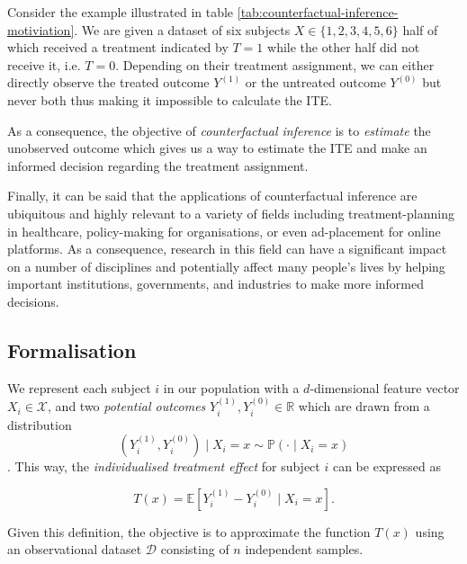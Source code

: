 Consider the example illustrated in table \ref{tab:counterfactual-inference-motiviation}. We are given a dataset of six subjects $X \in \{1, 2, 3, 4, 5, 6\}$ half of which received a treatment indicated by $T=1$ while the other half did not receive it, i.e. $T=0$. Depending on their treatment assignment, we can either directly observe the treated outcome $Y^{(1)}$ or the untreated outcome $Y^{(0)}$ but never both thus making it impossible to calculate the ITE. 


As a consequence, the objective of \emph{counterfactual inference} is to \emph{estimate} the unobserved outcome which gives us a way to estimate the ITE and make an informed decision regarding the treatment assignment. 

Finally, it can be said that the applications of counterfactual inference are ubiquitous and highly relevant to a variety of fields including treatment-planning in healthcare, policy-making for organisations, or even ad-placement for online platforms. As a consequence, research in this field can have a significant impact on a number of disciplines and potentially affect many people’s lives by helping important institutions, governments, and industries to make more informed decisions.


\subsection{Formalisation}
We represent each subject $i$ in our population  with a $d$-dimensional feature vector $X_i \in \mathcal{X}$, and two \emph{potential outcomes} $Y_{i}^{(1)}, Y_{i}^{(0)} \in \mathbb{R}$ which are drawn from a distribution
\begin{equation}
 (Y_{i}^{(1)}, Y_{i}^{(0)}) \mid X_i = x \sim \mathbb{P}(\cdot \mid X_i = x)
 \end{equation}.
  This way, the \emph{individualised treatment effect} for subject $i$ can be expressed as 

\begin{equation}
T(x) = \mathbb{E}[Y_{i}^{(1)} - Y_{i}^{(0)} \mid X_i = x] . \label{eq:ite}
\end{equation}

Given this definition, the objective is to approximate the function $T(x)$ using an observational dataset $\mathcal{D}$ consisting of $n$ independent samples. 

